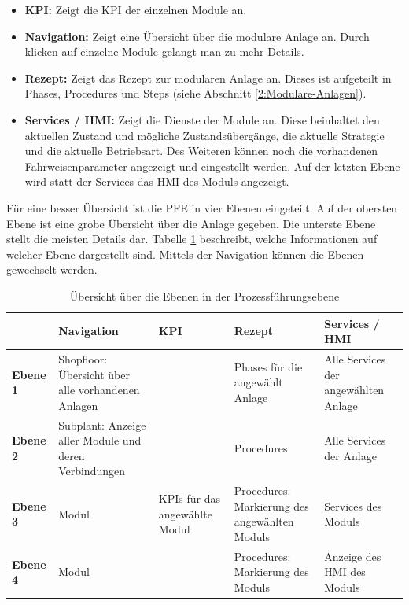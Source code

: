 \begin{itemize}
\item \textbf{KPI:} Zeigt die KPI der einzelnen Module an.
\item \textbf{Navigation:} Zeigt eine Übersicht über die modulare Anlage an. Durch klicken auf einzelne Module gelangt man zu mehr Details.
\item \textbf{Rezept:} Zeigt das Rezept zur modularen Anlage an. Dieses ist aufgeteilt in Phases, Procedures und Steps (siehe Abschnitt \ref{2:Modulare-Anlagen}).
\item \textbf{Services / HMI:} Zeigt die Dienste der Module an. Diese beinhaltet den aktuellen Zustand und mögliche Zustandsübergänge, die aktuelle Strategie  und die aktuelle Betriebsart. Des Weiteren können noch die vorhandenen Fahrweisenparameter angezeigt und eingestellt werden. Auf der letzten Ebene wird statt der Services das HMI des Moduls angezeigt.
\end{itemize}
Für eine besser Übersicht ist die PFE in vier Ebenen eingeteilt. Auf der obersten Ebene ist eine grobe Übersicht über die Anlage gegeben. Die unterste Ebene stellt die meisten Details dar. Tabelle \ref{tab:Ebenen-PFE} beschreibt, welche Informationen auf welcher Ebene dargestellt sind. Mittels der Navigation können die Ebenen gewechselt werden. 
\begin{table}[htbp]
\centering
\begin{tabular}{p{}|p{}|p{}|p{}|p{}|}
 & \textbf{Navigation} & \textbf{KPI} & \textbf{Rezept} & \textbf{Services / HMI} \\
\hline
\textbf{Ebene 1} & Shopfloor: Übersicht über alle vorhandenen Anlagen & & Phases für die angewählt Anlage & Alle Services der angewählten Anlage \\
\hline
\textbf{Ebene 2} & Subplant: Anzeige aller Module und deren Verbindungen & & Procedures & Alle Services der Anlage \\
\hline
\textbf{Ebene 3} & Modul & KPIs für das angewählte Modul & Procedures: Markierung des angewählten Moduls & Services des Moduls \\
\hline \textbf{Ebene 4} & Modul & & Procedures: Markierung des Moduls & Anzeige des HMI des Moduls \\
\hline
\end{tabular}
\label{tab:Ebenen-PFE}
\caption{Übersicht über die Ebenen in der Prozessführungsebene}
\end{table}


